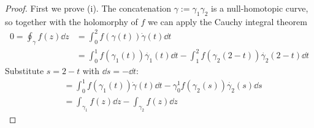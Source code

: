 \documentclass[../../script.tex]{subfiles}
\begin{document}
\begin{proof}
    First we prove (i). The concatenation $\gamma := \gamma_1 \gamma_2$ is a null-homotopic curve, so together with the holomorphy of $f$ we can apply the Cauchy integral theorem 
    \begin{equation}
        \begin{split}
            0 = \oint_{\gamma} f(z) \dd{z} &= \int_0^2 f(\gamma(t)) \dot{\gamma}(t) \dd{t} \\
            &= \int_0^1 f(\gamma_1(t))\dot{\gamma_1}(t) \dd{t} - \int_1^2 f(\gamma_2(2 - t)) \dot{\gamma_2}(2 - t) \dd{t}
        \end{split}
    \end{equation}
    Substitute $s = 2 - t$ with $\dd{s} = -\dd{t}$:
    \begin{equation}
        \begin{split}
            &= \int_0^1 f(\gamma_1(t)) \dot{\gamma}(t) \dd{t} - \gamma_0^1 f(\gamma_2(s)) \dot{\gamma_2}(s) \dd{s} \\
            &= \int_{\gamma_1} f(z) \dd{z} - \int_{\gamma_2} f(z) \dd{z}
        \end{split}
    \end{equation}


\end{proof}
\end{document}
